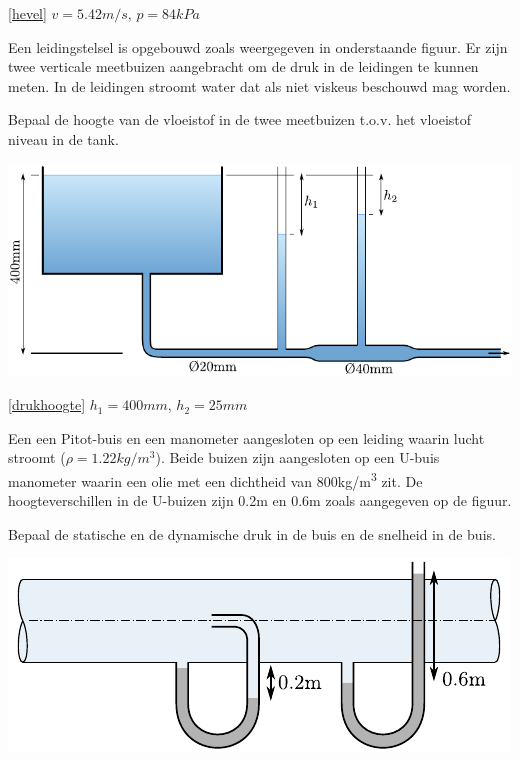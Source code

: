 	\begin{antwoord}{\ref{hevel}}
		$v = 5.42\unit{m/s}$, $p = 84\unit{kPa}$
	\end{antwoord}
	\begin{toepassing}
		\label{drukhoogte}
Een leidingstelsel is opgebouwd zoals weergegeven in onderstaande figuur. Er zijn twee verticale meetbuizen aangebracht om de druk in de leidingen te kunnen meten. In de leidingen stroomt water dat als niet viskeus beschouwd mag worden.
		
Bepaal de hoogte van de vloeistof in de twee meetbuizen t.o.v. het vloeistof niveau in de tank.
		\begin{center}
			\includegraphics{fig/behoudsvergelijkingen/drukhoogte}
		\end{center}
	\end{toepassing}
	\begin{antwoord}{\ref{drukhoogte}}
		$h_1 = 400\unit{mm}$, $h_2 = 25\unit{mm}$
	\end{antwoord}
	\begin{toepassing}
		\label{dynamische_druk}
Een een Pitot-buis en een manometer aangesloten op een leiding waarin lucht stroomt ($\rho=1.22\unit{kg/m^3}$). Beide buizen zijn aangesloten op een U-buis manometer waarin een olie met een dichtheid van 800\unit{kg/m^3} zit. De hoogteverschillen in de U-buizen zijn 0.2m en 0.6m zoals aangegeven op de figuur.

Bepaal de statische en de dynamische druk in de buis en de snelheid in de buis.
		\begin{center}
			\includegraphics{fig/behoudsvergelijkingen/dynamische_druk}
		\end{center}
	\end{toepassing}
